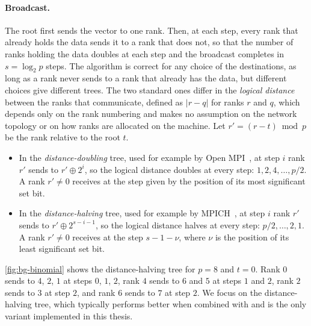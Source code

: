 \paragraph{Broadcast.}
The root first sends the vector to one rank.
Then, at each step, every rank that already holds the data sends it to a rank that does not, so that the number of ranks holding the data doubles at each step and the broadcast completes in $s=\log_2 p$ steps.
The algorithm is correct for any choice of the destinations, as long as a rank never sends to a rank that already has the data, but different choices give different trees.
The two standard ones differ in the \emph{logical distance} between the ranks that communicate, defined as $|r-q|$ for ranks $r$ and $q$, which depends only on the rank numbering and makes no assumption on the network topology or on how ranks are allocated on the machine.
Let $r'=(r-t)\bmod p$ be the rank relative to the root $t$.
\begin{itemize}
  \item In the \emph{distance-doubling} tree, used for example by Open MPI~\cite{desensi2025bine}, at step $i$ rank $r'$ sends to $r'\oplus2^{i}$, so the logical distance doubles at every step: $1,2,4,\dots,p/2$. A rank $r'\neq0$ receives at the step given by the position of its most significant set bit.
  \item In the \emph{distance-halving} tree, used for example by MPICH~\cite{desensi2025bine}, at step $i$ rank $r'$ sends to $r'\oplus2^{s-i-1}$, so the logical distance halves at every step: $p/2,\dots,2,1$. A rank $r'\neq0$ receives at the step $s-1-\nu$, where $\nu$ is the position of its least significant set bit.
\end{itemize}
\cref{fig:bg-binomial} shows the distance-halving tree for $p=8$ and $t=0$.
Rank $0$ sends to $4$, $2$, $1$ at steps $0$, $1$, $2$, rank $4$ sends to $6$ and $5$ at steps $1$ and $2$, rank $2$ sends to $3$ at step $2$, and rank $6$ sends to $7$ at step $2$.
We focus on the distance-halving tree, which typically performs better when combined with \bine{} and is the only variant implemented in this thesis.

